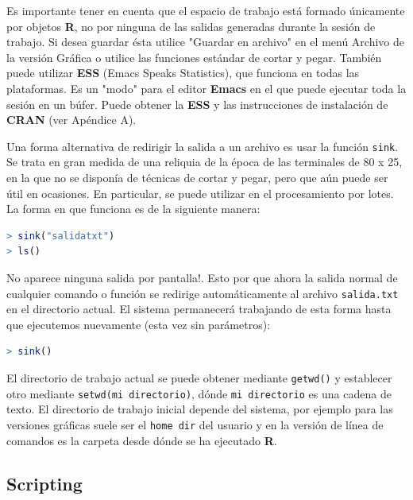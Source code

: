 Es importante tener en cuenta que el espacio de trabajo está formado únicamente
por objetos \textbf{R}, no por ninguna de las salidas generadas durante la
sesión de trabajo.  Si desea guardar ésta utilice "Guardar en archivo" en el
menú Archivo de la versión Gráfica o utilice las funciones estándar de cortar y
pegar. También puede utilizar \textbf{ESS} (Emacs Speaks Statistics), que
funciona en todas las plataformas. Es un "modo" para el editor \textbf{Emacs}
en el que puede ejecutar toda la sesión en un búfer. Puede obtener la
\textbf{ESS} y las instrucciones de instalación de \textbf{CRAN} (ver Apéndice
A).  

Una forma alternativa de redirigir la salida a un archivo es usar la función
\texttt{sink}. Se trata en gran medida de una reliquia de la época de las
terminales de 80 x 25, en la que no se disponía de técnicas de cortar y pegar,
pero que aún puede ser útil en ocasiones. En particular, se puede utilizar en
el procesamiento por lotes. La forma en que funciona es de la siguiente manera:

\begin{lstlisting}[language=R]
> sink("salidatxt")
> ls()
\end{lstlisting}

No aparece ninguna salida por pantalla!. Esto por que ahora la salida normal de
cualquier comando o función se redirige automáticamente al archivo
\texttt{salida.txt} en el directorio actual.  El sistema permanecerá trabajando
de esta forma hasta que ejecutemos nuevamente (esta vez sin parámetros):

\begin{lstlisting}[language=R]
> sink()
\end{lstlisting}

El directorio de trabajo actual se puede obtener mediante \texttt{getwd()} y
establecer otro mediante \texttt{setwd(mi directorio)}, dónde \texttt{mi
directorio} es una cadena de texto. El directorio de trabajo inicial depende
del sistema, por ejemplo para las versiones gráficas suele ser el \texttt{home
dir} del usuario y en la versión de línea de comandos es la carpeta desde dónde
se ha ejecutado \textbf{R}.

\subsection{Scripting}

